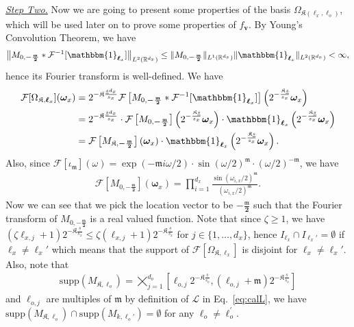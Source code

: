 \documentclass[11pt]{article}
\newcommand{\one}{\mathbbm{1}}
\newcommand{\bv}{\mathbf v}
\newcommand{\bomega}{\boldsymbol{\omega}}
\newcommand{\calF}{\mathcal{F}}
\newcommand{\calL}{\mathcal{L}}
\newcommand{\bl}{{\boldsymbol\ell}}
\newcommand{\0}{\mathbf{0}}
\begin{document}
\begin{appendix}
\vspace{3mm}
\noindent
\underline{\emph{Step Two.}}
Now we are going to present some properties of the basis $\Omega_{\mathfrak{K}(\bl_x,\bl_o)}$, which will be used later on to prove some properties of $f_{\bv}$. By Young's Convolution Theorem, we have 
\begin{align*}
    \left\|M_{0,\boldsymbol{-\frac{\mathfrak{m}}{2}}}\ast \calF^{-1}[\one_{\bl_{x}}]\right\|_{L^2(\mathbb{R}^{d_x})} \leq \|M_{0,\boldsymbol{-\frac{\mathfrak{m}}{2}}}\|_{L^1(\mathbb{R}^{d_x})}\|\one_{\bl_{x}}\|_{L^2(\mathbb{R}^{d_x})} < \infty,
\end{align*}
hence its Fourier transform is well-defined. We have
\begin{align}
    \calF[\Omega_{\mathfrak{K},\bl_x}](\bomega_x) &= 2^{-\mathfrak{K}\frac{\underline{s}d_x}{s_x}}\calF\left[M_{0,\boldsymbol{-\frac{\mathfrak{m}}{2}}}\ast \calF^{-1}[\one_{\bl_{x}}]\right]\left(2^{-\frac{\mathfrak{K}\underline{s}}{s_x}}\bomega_x\right) \nonumber\\
    &= 2^{-\mathfrak{K}\frac{\underline{s}d_x}{s_x}} \cdot \calF\left[M_{0,\boldsymbol{-\frac{\mathfrak{m}}{2}}}\right] \left(2^{-\frac{\mathfrak{K}\underline{s}}{s_x}}\bomega_x\right)  \cdot \one_{\bl_x}\left(2^{-\frac{\mathfrak{K}\underline{s}}{s_x}}\bomega_x\right) \nonumber \\
    &= \calF\left[M_{\mathfrak{K},\boldsymbol{-\frac{\mathfrak{m}}{2}}}\right] \left(\bomega_x\right)  \cdot \one_{\bl_x}\left(2^{-\frac{\mathfrak{K}\underline{s}}{s_x}}\bomega_x\right)
    \label{eq:fourier_omega_k_lx}.
\end{align}
Also, since $\calF[\iota_\mathfrak{m}](\omega)= \exp{(- \mathfrak{m} i \omega / 2)} \cdot \sin (\omega / 2)^{\mathfrak{m}} \cdot (\omega / 2)^{-\mathfrak{m}}$, we have 
\begin{align}\label{eq:fourier_M00}
    \calF\left[M_{0,\boldsymbol{-\frac{\mathfrak{m}}{2}}}\right](\bomega_x) = \prod_{i=1}^{d_x} \frac{\sin (\omega_{i,x} / 2)^{\mathfrak{m}}}{(\omega_{i,x} / 2)^{\mathfrak{m}}} .
\end{align}
Now we can see that we pick the location vector to be $-\boldsymbol{\frac{\mathfrak{m}}{2}}$ such that the Fourier transform of $M_{0,\boldsymbol{-\frac{\mathfrak{m}}{2}}}$ is a real valued function. Note that since $\zeta\geq 1$, we have $(\zeta \ell_{x,j} + 1)2^{-\mathfrak{K}\frac{\underline{s}}{s_x}} \leq \zeta (\ell_{x,j}+1)2^{-\mathfrak{K}\frac{\underline{s}}{s_x}}$ for $j \in \{1, \ldots, d_x \}$, hence $I_{\bl_x}\cap I_{\bl_x'} = \emptyset$ if $\bl_x \neq \bl_x'$ which means that the support of $\calF[\Omega_{\mathfrak{K},\bl_x}]$ is disjoint for $\bl_x \neq \bl_x'$.
Also, note that 
\begin{align*}
    \mathrm{supp}(M_{\mathfrak{K},\bl_o}) = \bigtimes_{j=1}^{d_o}[ \ell_{o,j} 2^{-\mathfrak{K}\frac{\underline{s}}{s_o}}, (\ell_{o,j} + \mathfrak{m})2^{-\mathfrak{K}\frac{\underline{s}}{s_o}}]
\end{align*}
and $ \ell_{o,j}$ are multiples of $\mathfrak{m}$ by definition of $\calL$ in Eq.~\eqref{eq:calL}, we have $\mathrm{supp}(M_{\mathfrak{K},\bl_o})\cap \mathrm{supp}(M_{k,\bl_o'}) = \emptyset $ for any $\bl_o \neq \bl_o^\prime$. 


\end{appendix}
\end{document}
